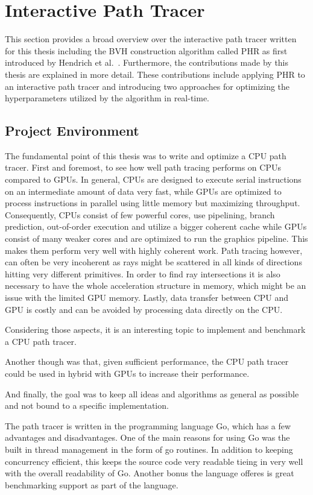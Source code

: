 \section{Interactive Path Tracer}
This section provides a broad overview over the interactive path tracer written for this thesis including the BVH construction algorithm called PHR as first introduced by Hendrich et al.~\cite{hendrich_parallel_2017}. Furthermore, the contributions made by this thesis are explained in more detail. These contributions include applying PHR to an interactive path tracer and introducing two approaches for optimizing the hyperparameters utilized by the algorithm in real-time. 

\subsection{Project Environment}
The fundamental point of this thesis was to write and optimize a CPU path tracer. First and foremost, to see how well path tracing performs on CPUs compared to GPUs. In general, CPUs are designed to execute serial instructions on an intermediate amount of data very fast, while GPUs are optimized to process instructions in parallel using little memory but maximizing throughput. Consequently, CPUs consist of few powerful cores, use pipelining, branch prediction, out-of-order execution and utilize a bigger coherent cache while GPUs consist of many weaker cores and are optimized to run the graphics pipeline. This makes them perform very well with highly coherent work. Path tracing however, can often be very incoherent as rays might be scattered in all kinds of directions hitting very different primitives. In order to find ray intersections it is also necessary to have the whole acceleration structure in memory, which might be an issue with the limited GPU memory. Lastly, data transfer between CPU and GPU is costly and can be avoided by processing data directly on the CPU. 

Considering those aspects, it is an interesting topic to implement and benchmark a CPU path tracer.

Another though was that, given sufficient performance, the CPU path tracer could be used in hybrid with GPUs to increase their performance. %

And finally, the goal was to keep all ideas and algorithms as general as possible and not bound to a specific implementation.

The path tracer is written in the programming language Go, which has a few advantages and disadvantages. One of the main reasons for using Go was the built in thread management in the form of go routines. %
In addition to keeping concurrency efficient, this keeps the source code very readable tieing in very well with the overall readability of Go. Another bonus the language offeres is great benchmarking support as part of the language.

